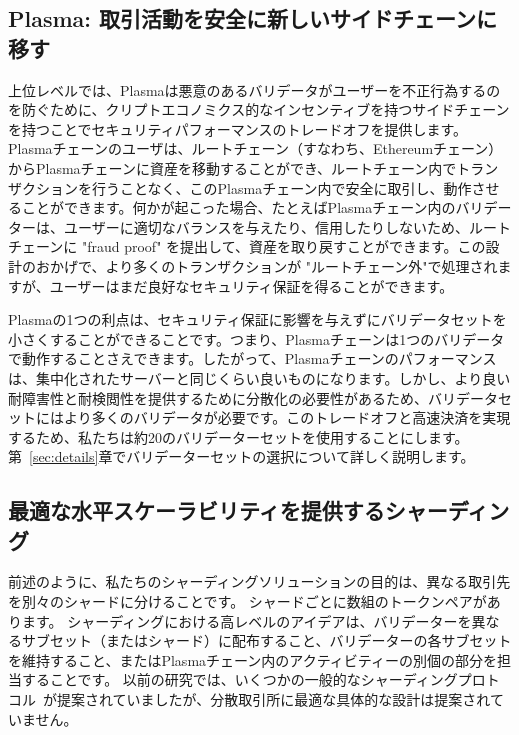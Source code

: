 \subsection{Plasma: 取引活動を安全に新しいサイドチェーンに移す}

上位レベルでは、Plasmaは悪意のあるバリデータがユーザーを不正行為するのを防ぐために、クリプトエコノミクス的なインセンティブを持つサイドチェーンを持つことでセキュリティパフォーマンスのトレードオフを提供します。 Plasmaチェーンのユーザは、ルートチェーン（すなわち、Ethereumチェーン）からPlasmaチェーンに資産を移動することができ、ルートチェーン内でトランザクションを行うことなく、このPlasmaチェーン内で安全に取引し、動作させることができます。何かが起こった場合、たとえばPlasmaチェーン内のバリデーターは、ユーザーに適切なバランスを与えたり、信用したりしないため、ルートチェーンに "fraud proof" を提出して、資産を取り戻すことができます。この設計のおかげで、より多くのトランザクションが "ルートチェーン外"で処理されますが、ユーザーはまだ良好なセキュリティ保証を得ることができます。

Plasmaの1つの利点は、セキュリティ保証に影響を与えずにバリデータセットを小さくすることができることです。つまり、Plasmaチェーンは1つのバリデータで動作することさえできます。したがって、Plasmaチェーンのパフォーマンスは、集中化されたサーバーと同じくらい良いものになります。しかし、より良い耐障害性と耐検閲性を提供するために分散化の必要性があるため、バリデータセットにはより多くのバリデータが必要です。このトレードオフと高速決済を実現するため、私たちは約20のバリデーターセットを使用することにします。第~\ref{sec:details}章でバリデーターセットの選択について詳しく説明します。

\subsection{最適な水平スケーラビリティを提供するシャーディング}

前述のように、私たちのシャーディングソリューションの目的は、異なる取引先を別々のシャードに分けることです。 シャードごとに数組のトークンペアがあります。 シャーディングにおける高レベルのアイデアは、バリデーターを異なるサブセット（またはシャード）に配布すること、バリデーターの各サブセットを維持すること、またはPlasmaチェーン内のアクティビティーの別個の部分を担当することです。 以前の研究では、いくつかの一般的なシャーディングプロトコル~\cite{elastico, omniledger, zilliqa}が提案されていましたが、分散取引所に最適な具体的な設計は提案されていません。

